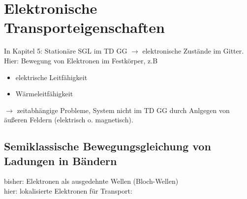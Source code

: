 
\section{Elektronische Transporteigenschaften} \label{sec:6}
In Kapitel 5: Stationäre SGL im TD GG $\rightarrow$ elektronische Zustände im Gitter. \\
Hier: Bewegung von Elektronen im Festkörper, z.B
\begin{itemize}
    \item elektrische Leitfähigkeit
    \item Wärmeleitfähigkeit
\end{itemize}
$\rightarrow$ zeitabhängige Probleme, System nicht im TD GG durch Anlgegen von äußeren Feldern (elektrisch o. magnetisch).

\subsection{Semiklassische Bewegungsgleichung von Ladungen in Bändern} \label{sec:6_1}
bisher: Elektronen als ausgedehnte Wellen (Bloch-Wellen) \\
hier: lokalisierte Elektronen für Transport:
